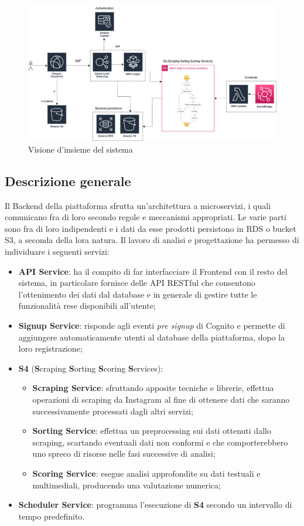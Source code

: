 \begin{figure}[!h]
    \includegraphics[width=16cm]{sezioni/images/overview.png}
    \centering
    \caption{Visione d'insieme del sistema}
\end{figure}

\subsection{Descrizione generale}
Il Backend della piattaforma sfrutta un'architettura a microservizi, i quali comunicano fra di loro secondo regole e meccanismi appropriati.
Le varie parti sono fra di loro indipendenti e i dati da esse prodotti persistono in RDS o bucket S3, a seconda della lora natura.
Il lavoro di analisi e progettazione ha permesso di individuare i seguenti servizi:
\begin{itemize}
    \item \textbf{API Service}: ha il compito di far interfacciare il Frontend con il resto del sistema, in particolare fornisce
    delle API RESTful che consentono l'ottenimento dei dati dal database e in generale di gestire tutte le funzionalità rese disponibili all'utente;
    \item \textbf{Signup Service}: risponde agli eventi \textit{pre signup} di Cognito e permette di aggiungere automaticamente utenti al database della piattaforma, dopo la loro registrazione;
    \item \textbf{S4} (\textbf{S}craping \textbf{S}orting \textbf{S}coring \textbf{S}ervices):
        \begin{itemize}
            \item \textbf{Scraping Service}: sfruttando apposite tecniche e librerie, effettua operazioni di scraping da Instagram al fine di ottenere dati che
            saranno successivamente processati dagli altri servizi;
            \item \textbf{Sorting Service}: effettua un preprocessing sui dati ottenuti dallo scraping, scartando eventuali dati non conformi e che comporterebbero
            uno spreco di risorse nelle fasi successive di analisi;
            \item \textbf{Scoring Service}: esegue analisi approfondite su dati testuali e multimediali, producendo una valutazione numerica; 
        \end{itemize}
    \item \textbf{Scheduler Service}: programma l'esecuzione di \textbf{S4} secondo un intervallo di tempo predefinito.
\end{itemize}

